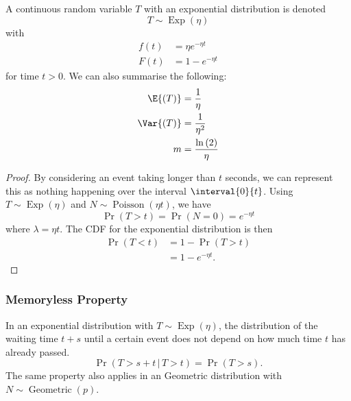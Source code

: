 \documentclass{article}
\begin{document}
A continuous random variable \(T\) with an exponential distribution is denoted
\begin{equation*}
    T \sim \operatorname{Exp}{\left( \eta \right)}
\end{equation*}
with
\begin{align*}
    f\left( t \right) & = \eta e^{-\eta t} \\
    F\left( t \right) & = 1 - e^{-\eta t}
\end{align*}
for time \(t > 0\).
We can also summarise the following:
\begin{align*}
    \E{\left( T \right)}   & = \frac{1}{\eta}                     \\
    \Var{\left( T \right)} & = \frac{1}{\eta^2}                   \\
    m                      & = \frac{\ln{\left( 2 \right)}}{\eta}
\end{align*}
\begin{proof}
    By considering an event taking longer than \(t\) seconds, we can represent this as nothing happening
    over the interval \(\interval{0}{t}\). Using \(T \sim \operatorname{Exp}{\left( \eta \right)}\) and
    \(N \sim \operatorname{Poisson}{\left( \eta t \right)}\), we have
    \begin{equation*}
        \Pr{\left( T > t \right)} = \Pr{\left( N = 0 \right)} = e^{-\eta t}
    \end{equation*}
    where \(\lambda = \eta t\). The CDF for the exponential distribution is then
    \begin{align*}
        \Pr{\left( T < t \right)} & = 1 - \Pr{\left( T > t \right)} \\
                                  & = 1 - e^{-\eta t}.
    \end{align*}
\end{proof}
\subsubsection{Memoryless Property}
In an exponential distribution with \(T \sim \operatorname{Exp}{\left( \eta \right)}\),
the distribution of the waiting time \(t + s\) until a certain event does not depend on
how much time \(t\) has already passed.
\begin{equation*}
    \Pr{\left( T > s + t \,\vert\, T > t \right)} = \Pr{\left( T > s \right)}.
\end{equation*}
The same property also applies in an Geometric distribution with \(N \sim \operatorname{Geometric}{\left( p \right)}\).
\end{document}
